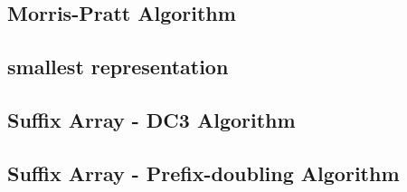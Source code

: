 \documentclass[a4paper,5pt,twocolumn,titlepage]{article}
\begin{document}
\subsection{Morris-Pratt Algorithm}

\subsection{smallest representation}

\subsection{Suffix Array - DC3 Algorithm}

\subsection{Suffix Array - Prefix-doubling Algorithm}

\end{document}
